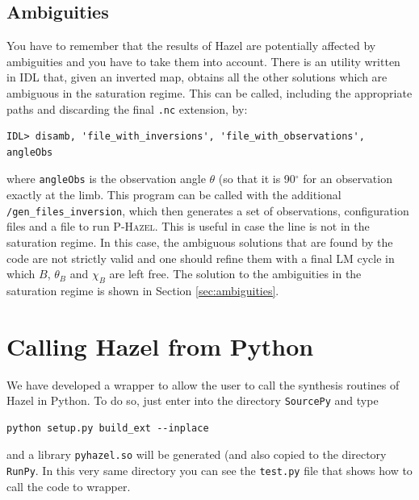 \documentclass[12pt]{article}
\def\HM{\textsc{P-Hazel}}
\begin{document}
\subsection{Ambiguities}
You have to remember that the results of Hazel are potentially affected by ambiguities and you have
to take them into account. There is an utility written in IDL that, given an inverted map, obtains
all the other solutions which are ambiguous in the saturation regime. This can be called, including the
appropriate paths and discarding the final \texttt{.nc} extension, by:
\begin{verbatim}
IDL> disamb, 'file_with_inversions', 'file_with_observations', angleObs
\end{verbatim}
where \texttt{angleObs} is the observation angle $\theta$ (so that it is 90$^\circ$ for an observation
exactly at the limb.
This program can be called with the additional \texttt{/gen\_files\_inversion}, which then generates
a set of observations, configuration files and a file to run \HM. This is useful in case the line is not
in the saturation regime. In this case, the ambiguous solutions that are found by the code are
not strictly valid and one should refine them with a final LM cycle in which $B$, $\theta_B$ and $\chi_B$
are left free. The solution to the ambiguities in the saturation regime is shown in Section \ref{sec:ambiguities}.

\section{Calling Hazel from Python}
We have developed a wrapper to allow the user to call the synthesis routines of Hazel in Python.
To do so, just enter into the directory \texttt{SourcePy} and type
\begin{verbatim}
python setup.py build_ext --inplace
\end{verbatim}
and a library \texttt{pyhazel.so} will be generated (and also copied to the directory
\texttt{RunPy}. In this very same directory you can see the \texttt{test.py} file that
shows how to call the code to wrapper.


\end{document}
